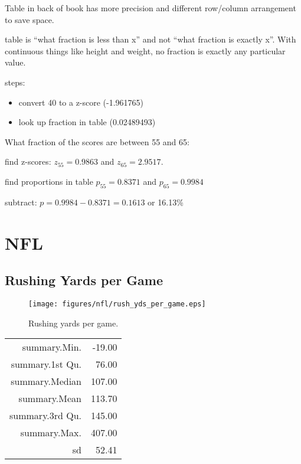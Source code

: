 \documentclass{exam}
\begin{document}
  \begin{itemize*}
    \item Table in back of book has more precision and different row/column
      arrangement to save space.
    \item table is ``what fraction is less than x'' and not ``what fraction is
      exactly x''.  With continuous things like height and weight, no fraction is
      exactly any particular value.
  \end{itemize*}

  steps:
  \begin{itemize}
    \item convert 40 to a z-score (-1.961765)
    \item look up fraction in table (0.02489493)
  \end{itemize}

  What fraction of the scores are between 55 and 65:
  \begin{itemize*}
    \item find z-scores: $z_{55} = 0.9863$ and $z_{65} = 2.9517$.
    \item find proportions in table $p_{55} = 0.8371$ and $p_{65} = 0.9984$
    \item subtract: $p = 0.9984 - 0.8371 = 0.1613$ or 16.13\%
  \end{itemize*}


  \section{NFL}

  \subsection{Rushing Yards per Game}

  \begin{figure}[H]
    \centering
    \texttt{[image: figures/nfl/rush\_yds\_per\_game.eps]}
    \caption{Rushing yards per game.}
  \end{figure}

  \begin{table}[H]
    \centering
    \begin{tabular}{rr}
      \toprule
      summary.Min.    & -19.00 \\
      summary.1st Qu. & 76.00 \\
      summary.Median  & 107.00 \\
      summary.Mean    & 113.70 \\
      summary.3rd Qu. & 145.00 \\
      summary.Max.    & 407.00 \\
      sd              & 52.41 \\
      \bottomrule
    \end{tabular}
  \end{table}
\end{document}
